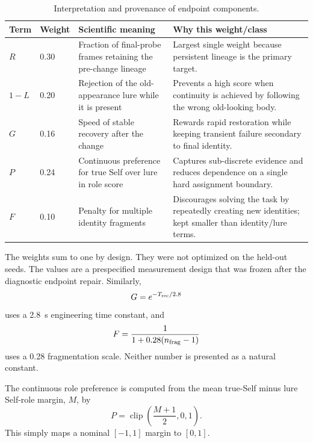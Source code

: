 \documentclass[10pt,journal,onecolumn]{IEEEtran}
\begin{document}
\begin{table}[h]
\caption{Interpretation and provenance of endpoint components.}
\centering
\footnotesize
\begin{tabularx}{\textwidth}{@{}p{}p{}X p{}@{}}
\toprule
Term & Weight & Scientific meaning & Why this weight/class \\
\midrule
$R$ & 0.30 & Fraction of final-probe frames retaining the pre-change lineage & Largest single weight because persistent lineage is the primary target. \\
$1-L$ & 0.20 & Rejection of the old-appearance lure while it is present & Prevents a high score when continuity is achieved by following the wrong old-looking body. \\
$G$ & 0.16 & Speed of stable recovery after the change & Rewards rapid restoration while keeping transient failure secondary to final identity. \\
$P$ & 0.24 & Continuous preference for true Self over lure in role score & Captures sub-discrete evidence and reduces dependence on a single hard assignment boundary. \\
$F$ & 0.10 & Penalty for multiple identity fragments & Discourages solving the task by repeatedly creating new identities; kept smaller than identity/lure terms. \\
\bottomrule
\end{tabularx}
\end{table}

The weights sum to one by design. They were not optimized on the held-out seeds. The values are a prespecified measurement design that was frozen after the diagnostic endpoint repair. Similarly,
\begin{equation}
G=e^{-T_{\rm rec}/2.8}
\end{equation}
uses a 2.8~s engineering time constant, and
\begin{equation}
F=\frac{1}{1+0.28(n_{\rm frag}-1)}
\end{equation}
uses a 0.28 fragmentation scale. Neither number is presented as a natural constant.

The continuous role preference is computed from the mean true-Self minus lure Self-role margin, $M$, by
\begin{equation}
P=\operatorname{clip}\left(\frac{M+1}{2},0,1\right).
\end{equation}
This simply maps a nominal $[-1,1]$ margin to $[0,1]$.
\end{document}

